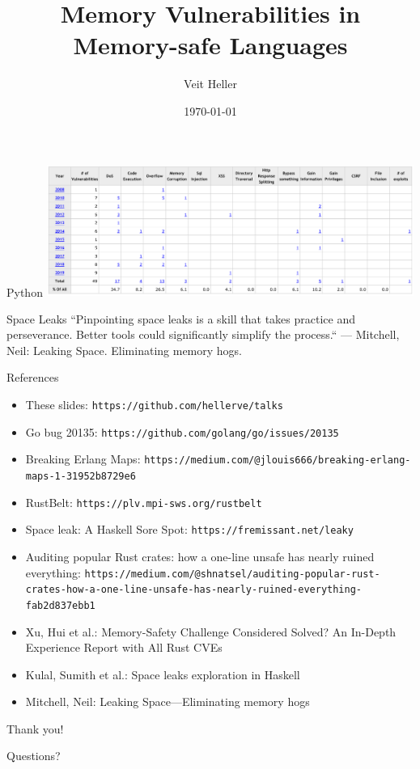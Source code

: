 \documentclass[aspectratio=169,14pt]{beamer}
\title{Memory Vulnerabilities in Memory-safe Languages}
\date{\today}
\author{Veit Heller}
\institute{Information Security Meetup Berlin, August 2020}
\begin{document}
  \maketitle
  \begin{frame}{Python}
    \includegraphics[width=12cm]{python_cves}
  \end{frame}
  \begin{frame}{Space Leaks}
    ``Pinpointing space leaks is a skill that takes practice and perseverance. Better
    tools could significantly simplify the process.``
    --- Mitchell, Neil: Leaking Space. Eliminating memory hogs.
  \end{frame}
  \begin{frame}{References}
    \begin{itemize}
      \item These slides: \texttt{https://github.com/hellerve/talks}
      \item Go bug 20135: \texttt{https://github.com/golang/go/issues/20135}
      \item Breaking Erlang Maps: \texttt{https://medium.com/@jlouis666/breaking-erlang-maps-1-31952b8729e6}
      \item RustBelt: \texttt{https://plv.mpi-sws.org/rustbelt}
      \item Space leak: A Haskell Sore Spot: \texttt{https://fremissant.net/leaky}
      \item Auditing popular Rust crates: how a one-line unsafe has nearly ruined everything: \texttt{https://medium.com/@shnatsel/auditing-popular-rust-crates-how-a-one-line-unsafe-has-nearly-ruined-everything-fab2d837ebb1}
      \item Xu, Hui et al.: Memory-Safety Challenge Considered Solved? An In-Depth Experience Report with All Rust CVEs
      \item Kulal, Sumith et al.: Space leaks exploration in Haskell
      \item Mitchell, Neil: Leaking Space—Eliminating memory hogs
    \end{itemize}
  \end{frame}
  \begin{frame}{}
    Thank you!

    \bigskip

    Questions?
  \end{frame}
\end{document}
